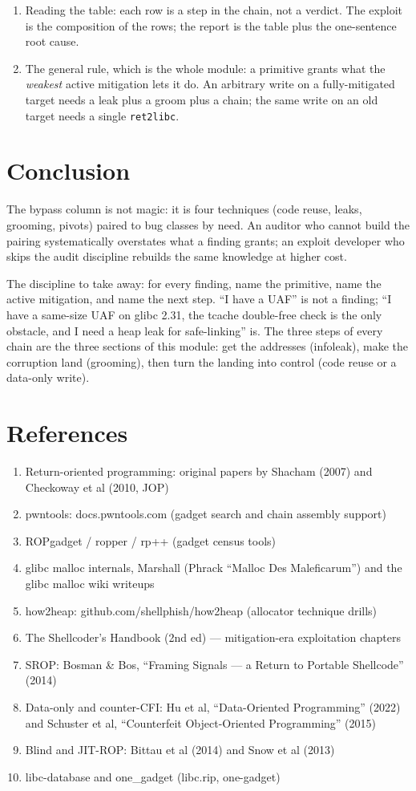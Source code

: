 \documentclass[12pt]{Training}
\begin{document}
\begin{enumerate}
    \item Reading the table: each row is a step in the chain, not a verdict. The exploit is the composition of the rows; the report is the table plus the one-sentence root cause.
    \item The general rule, which is the whole module: a primitive grants what the \emph{weakest} active mitigation lets it do. An arbitrary write on a fully-mitigated target needs a leak plus a groom plus a chain; the same write on an old target needs a single \lstinline{ret2libc}.
\end{enumerate}

\section*{Conclusion}
The bypass column is not magic: it is four techniques (code reuse, leaks, grooming, pivots) paired to bug classes by need. An auditor who cannot build the pairing systematically overstates what a finding grants; an exploit developer who skips the audit discipline rebuilds the same knowledge at higher cost.

The discipline to take away: for every finding, name the primitive, name the active mitigation, and name the next step. ``I have a UAF'' is not a finding; ``I have a same-size UAF on glibc 2.31, the tcache double-free check is the only obstacle, and I need a heap leak for safe-linking'' is. The three steps of every chain are the three sections of this module: get the addresses (infoleak), make the corruption land (grooming), then turn the landing into control (code reuse or a data-only write).

\section*{References}
\begin{enumerate}
	\item Return-oriented programming: original papers by Shacham (2007) and Checkoway et al (2010, JOP)
	\item pwntools: docs.pwntools.com (gadget search and chain assembly support)
	\item ROPgadget / ropper / rp++ (gadget census tools)
	\item glibc malloc internals, Marshall (Phrack ``Malloc Des Maleficarum'') and the glibc malloc wiki writeups
	\item how2heap: github.com/shellphish/how2heap (allocator technique drills)
	\item The Shellcoder's Handbook (2nd ed) --- mitigation-era exploitation chapters
	\item SROP: Bosman \& Bos, ``Framing Signals --- a Return to Portable Shellcode'' (2014)
	\item Data-only and counter-CFI: Hu et al, ``Data-Oriented Programming'' (2022) and Schuster et al, ``Counterfeit Object-Oriented Programming'' (2015)
	\item Blind and JIT-ROP: Bittau et al (2014) and Snow et al (2013)
	\item libc-database and one\_gadget (libc.rip, one-gadget)
\end{enumerate}
\end{document}
